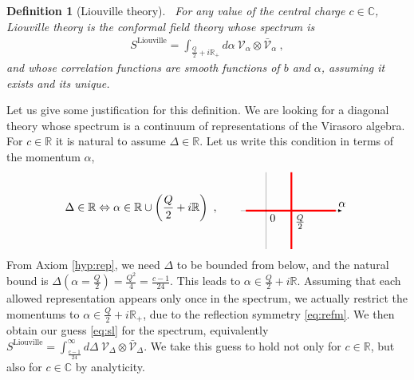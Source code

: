 \documentclass[12pt, a4paper]{article}
\theoremstyle{break}
\newtheorem{defn}[exo]{Definition}
\begin{document}
\begin{defn}[Liouville theory]
 ~\label{def:liou}
 For any value of the central charge $c\in\mathbb{C}$, Liouville theory is the conformal field theory whose spectrum is 
 \begin{align}
  S^\mathrm{Liouville} 
= \int_{\frac{Q}{2}+i\mathbb{R}_+}  d\alpha\ \mathcal V_\alpha \otimes 
   \bar{\mathcal V}_\alpha\ , 
   \label{eq:sl}
 \end{align}
and whose correlation functions are smooth functions of $b$ and $\alpha$, assuming it exists and its unique.
\end{defn}
Let us give some justification for this definition. We are looking for a diagonal theory whose spectrum is a continuum of representations of the Virasoro algebra. For $c\in \mathbb{R}$ it is natural to assume $\Delta\in \mathbb{R}$. Let us write this condition in terms of the momentum $\alpha$,
\begin{align}
 \Delta \in \mathbb{R} \Leftrightarrow \alpha\in \mathbb{R} \cup \left(\frac{Q}{2} + i\mathbb{R}\right)\ ,
  \qquad
   \begin{tikzpicture}[scale = .4, baseline=(current  bounding  box.center)]
  \draw[-latex, very thin] (-2, 0) -- (0, 0) node[below right] {$0$} -- (2, 0) node[below right] {$\frac{Q}{2}$} -- (4, 0)  -- (6, 0) node[above] {$\alpha$};
  \draw[red, ultra thick] (-1.6, 0) -- (5.5, 0);
  \draw[red, ultra thick] (2, -3) -- (2, 3);
  \draw[very thin] (0, -3) -- (0, 3);
 \end{tikzpicture}
\end{align}
From Axiom \ref{hyp:rep}, 
we need $\Delta$ to be bounded from below, and the natural bound is $\Delta(\alpha=\frac{Q}{2}) = \frac{Q^2}{4}=\frac{c-1}{24}$. This leads to $\alpha \in \frac{Q}{2}+i\mathbb{R}$. Assuming that each allowed representation appears only once in the spectrum, we actually restrict the momentums to $\alpha \in \frac{Q}{2}+i\mathbb{R}_+$, due to the reflection symmetry \eqref{eq:refm}.
We then obtain our guess \eqref{eq:sl} for the spectrum, equivalently $S^\mathrm{Liouville} 
= \int_{\frac{c-1}{24}}^\infty d\Delta\ \mathcal V_{\Delta}\otimes \bar{\mathcal{V}}_\Delta $.
We take this guess to hold not only for $c\in\mathbb{R}$, but also for $c\in\mathbb{C}$ by analyticity.
\end{document}
